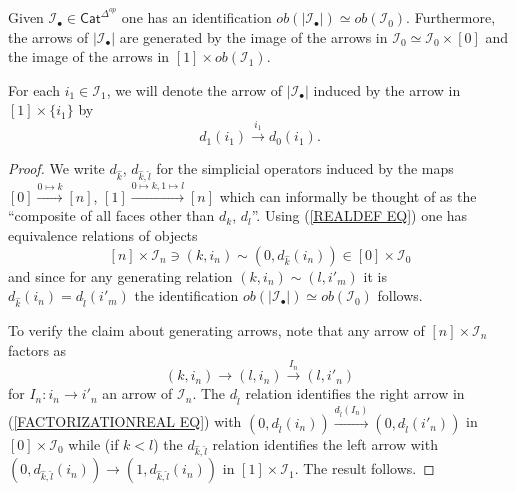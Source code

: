 \documentclass[a4paper,10pt]{article}%
\begin{document}
\begin{lemma}\label{OBJGENREL LEMMA}
	Given $\mathcal{I}_{\bullet} \in \mathsf{Cat}^{\Delta^{op}}$ one has an identification
	$ob(|\mathcal{I}_{\bullet}|) \simeq ob(\mathcal{I}_0)$.
	Furthermore, the arrows of $|\mathcal{I}_{\bullet}|$ are generated by the image of the arrows in $\mathcal{I}_0 \simeq \mathcal{I}_0 \times [0]$ and the image of the arrows in 
	$[1] \times ob(\mathcal{I}_1)$.
\end{lemma}

For each $i_1 \in \mathcal{I}_1$, we will denote the arrow of 
$|\mathcal{I}_{\bullet}|$ induced by the arrow in $[1] \times \{i_1\}$ by
\[d_1(i_1) \xrightarrow{i_1} d_0(i_1).\]


\begin{proof}
	We write $d_{\hat{k}}$, $d_{\hat{k},\hat{l}}$ for the simplicial operators induced by the maps 
	$[0]\xrightarrow{0 \mapsto k} [n]$,
	$[1]\xrightarrow{0 \mapsto k,1 \mapsto l} [n]$
	which can informally be thought of as the ``composite of all faces other than $d_k$, $d_l$''.
Using (\ref{REALDEF EQ}) one has equivalence relations of objects  
\[ [n] \times \mathcal{I}_n \ni (k,i_n) \sim (0,d_{\hat{k}}(i_n))
\in [0] \times \mathcal{I}_0 \]
and since for any generating relation $(k,i_n)\sim (l,i'_m)$
it is $d_{\hat{k}}(i_n) = d_{\hat{l}}(i'_m)$ the identification 
$ob(|\mathcal{I}_{\bullet}|) \simeq ob(\mathcal{I}_0)$
follows.


To verify the claim about generating arrows, note that any arrow of $[n]\times \mathcal{I}_n$ factors as 
\begin{equation}\label{FACTORIZATIONREAL EQ}
(k,i_n) \to (l,i_n)  \xrightarrow{I_n} (l,i'_n)
\end{equation}
for $I_n \colon i_n \to i'_n$
an arrow of $\mathcal{I}_n$. 
The $d_{\hat{l}}$ relation identifies the right arrow in 
(\ref{FACTORIZATIONREAL EQ})
with
$(0,d_{\hat{l}}(i_n))
	\xrightarrow{d_{\hat{l}}(I_n)}
(0,d_{\hat{l}}(i'_n))
$
in $[0]\times \mathcal{I}_0$
while (if $k<l$) the $d_{\hat{k},\hat{l}}$ relation identifies the left arrow with 
$(0,d_{\hat{k},\hat{l}}(i_n)) \to (1,d_{\hat{k},\hat{l}}(i_n))$
in $[1]\times \mathcal{I}_1$. The result follows.
\end{proof}
\end{document}
